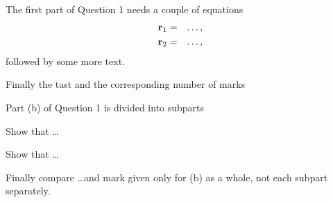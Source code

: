\item
The first part of Question 1 needs a couple of equations
\begin{eqnarray*}
\mathbf{r}_1&=& \ldots,
\\
\mathbf{r}_2&=&\ldots,
\end{eqnarray*}
followed by some more text.

Finally the tast and the corresponding number of marks

\item
Part (b) of Question 1 is divided into subparts
\qqitemsbegin
\item
Show that \ldots

\item
Show that \ldots

\item
Finally compare \ldots and mark given only for (b) as a whole, not each subpart separately.\\
\qqitemsend
